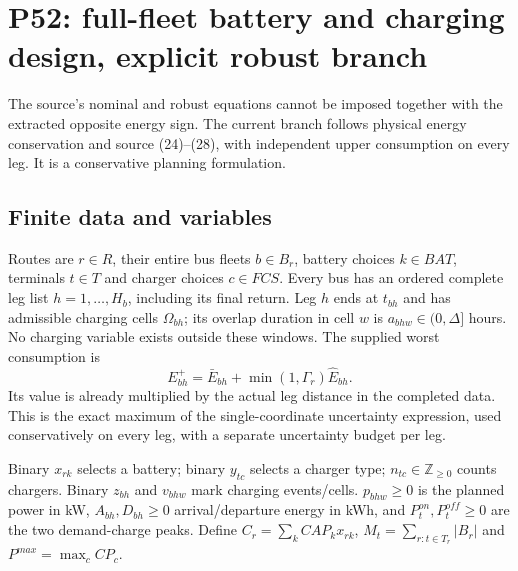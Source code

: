 \documentclass[11pt]{article}
\begin{document}
\section*{P52: full-fleet battery and charging design, explicit robust branch}
The source's nominal and robust equations cannot be imposed together with the
extracted opposite energy sign. The current branch follows physical energy
conservation and source (24)--(28), with independent upper consumption on every
leg. It is a conservative planning formulation.

\subsection*{Finite data and variables}
Routes are $r\in R$, their entire bus fleets $b\in B_r$, battery choices $k\in BAT$,
terminals $t\in T$ and charger choices $c\in FCS$. Every bus has an ordered complete
leg list $h=1,\ldots,H_b$, including its final return. Leg $h$ ends at $t_{bh}$
and has admissible charging cells $\Omega_{bh}$; its overlap duration in cell
$w$ is $a_{bhw}\in(0,\Delta]$ hours. No charging variable exists outside these
windows. The supplied worst consumption is
\[
 E_{bh}^{+}=\bar E_{bh}+\min(1,\Gamma_r)\widehat E_{bh}.
\]
Its value is already multiplied by the actual leg distance in the completed data.
This is the exact maximum of the single-coordinate uncertainty expression, used
conservatively on every leg, with a separate uncertainty budget per leg.

Binary $x_{rk}$ selects a battery; binary $y_{tc}$ selects a charger type;
$n_{tc}\in\mathbb Z_{\ge0}$ counts chargers. Binary $z_{bh}$ and $v_{bhw}$
mark charging events/cells. $p_{bhw}\ge0$ is the planned power in kW,
$A_{bh},D_{bh}\ge0$ arrival/departure energy in kWh, and $P_t^{on},P_t^{off}\ge0$
are the two demand-charge peaks. Define
$C_r=\sum_k CAP_kx_{rk}$, $M_t=\sum_{r:t\in T_r}|B_r|$ and
$P^{max}=\max_c CP_c$.
\end{document}
